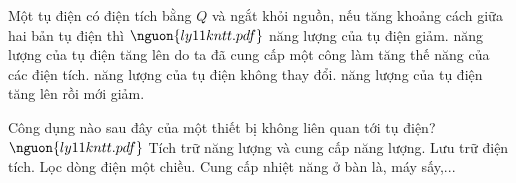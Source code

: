 \begin{ex}
Một tụ điện có điện tích bằng $Q$ và ngắt khỏi nguồn, nếu tăng khoảng cách giữa hai bản tụ điện thì $\nguon{ly11 kntt.pdf}$
\choice
{năng lượng của tụ điện giảm.}
{năng lượng của tụ điện tăng lên do ta đã cung cấp một công làm tăng thế năng của các điện tích.}
{\True năng lượng của tụ điện không thay đổi.}
{năng lượng của tụ điện tăng lên rồi mới giảm.}
\end{ex}

\begin{ex}
Công dụng nào sau đây của một thiết bị không liên quan tới tụ điện? $\nguon{ly11 kntt.pdf}$
\choice
{Tích trữ năng lượng và cung cấp năng lượng.}
{Lưu trữ điện tích.}
{Lọc dòng điện một chiều.}
{\True Cung cấp nhiệt năng ở bàn là, máy sấy,...}
\end{ex}


